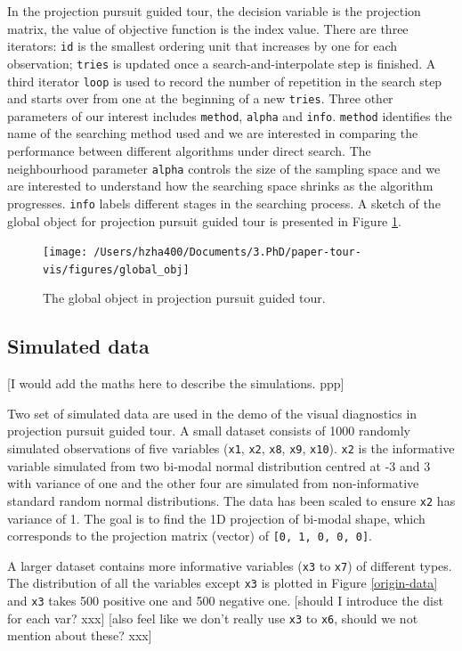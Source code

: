 \documentclass[12pt]{article}
\begin{document}
In the projection pursuit guided tour, the decision variable is the
projection matrix, the value of objective function is the index value.
There are three iterators: \texttt{id} is the smallest ordering unit
that increases by one for each observation; \texttt{tries} is updated
once a search-and-interpolate step is finished. A third iterator
\texttt{loop} is used to record the number of repetition in the search
step and starts over from one at the beginning of a new \texttt{tries}.
Three other parameters of our interest includes \texttt{method},
\texttt{alpha} and \texttt{info}. \texttt{method} identifies the name of
the searching method used and we are interested in comparing the
performance between different algorithms under direct search. The
neighbourhood parameter \texttt{alpha} controls the size of the sampling
space and we are interested to understand how the searching space
shrinks as the algorithm progresses. \texttt{info} labels different
stages in the searching process. A sketch of the global object for
projection pursuit guided tour is presented in Figure \ref{fig:glb-obj}.

\begin{figure}
\texttt{[image: /Users/hzha400/Documents/3.PhD/paper-tour-vis/figures/global\_obj]} \caption{\label{glb-obj}The global object in projection pursuit guided tour.}\label{fig:glb-obj}
\end{figure}

\hypertarget{simulated-data}{%
\subsection{Simulated data}\label{simulated-data}}

{[}I would add the maths here to describe the simulations. ppp{]}

Two set of simulated data are used in the demo of the visual diagnostics
in projection pursuit guided tour. A small dataset consists of 1000
randomly simulated observations of five variables (\texttt{x1},
\texttt{x2}, \texttt{x8}, \texttt{x9}, \texttt{x10}). \texttt{x2} is the
informative variable simulated from two bi-modal normal distribution
centred at -3 and 3 with variance of one and the other four are
simulated from non-informative standard random normal distributions. The
data has been scaled to ensure \texttt{x2} has variance of 1. The goal
is to find the 1D projection of bi-modal shape, which corresponds to the
projection matrix (vector) of \texttt{{[}0,\ 1,\ 0,\ 0,\ 0{]}}.

A larger dataset contains more informative variables (\texttt{x3} to
\texttt{x7}) of different types. The distribution of all the variables
except \texttt{x3} is plotted in Figure \ref{origin-data} and
\texttt{x3} takes 500 positive one and 500 negative one. {[}should I
introduce the dist for each var? xxx{]} {[}also feel like we don't
really use \texttt{x3} to \texttt{x6}, should we not mention about
these? xxx{]}
\end{document}
